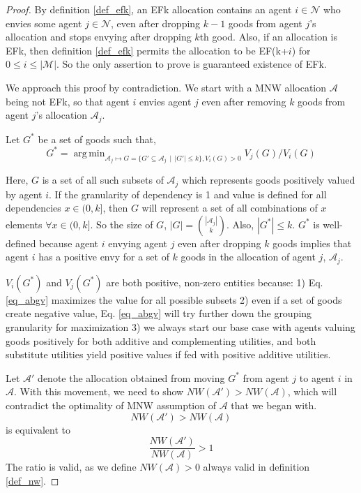 \begin{proof}
By definition \ref{def_efk}, an EFk allocation contains an agent $i \in \mathcal{N}$ who envies some agent $j \in \mathcal{N}$, even after dropping $k-1$ goods from agent $j$'s allocation and stops envying after dropping $k$th good. Also, if an allocation is EFk, then definition \ref{def_efk} permits the allocation to be EF(k+$i$) for $0 \leq i \leq |\mathcal{M}|$. So the only assertion to prove is guaranteed existence of EFk.

We approach this proof by contradiction. We start with a MNW allocation $\mathcal{A}$ being not EFk, so that agent $i$ envies agent $j$ even after removing $k$ goods from agent $j$'s allocation $\mathcal{A}_j$.



Let $G^*$  be a set of goods such that,
\[
    G^* = \operatorname{arg\,min}_{\mathcal{A}_j \mapsto G = \{G' \subseteq \mathcal{A}_j \, \mid \, \lvert G'\rvert \leq k\}, V_i(G)>0} V_j(G)/V_i(G)
\]

Here, $G$ is a set of all such subsets of $\mathcal{A}_j$ which represents goods positively valued by agent $i$. If the granularity of dependency is 1 and value is defined for all dependencies $x \in (0, k]$, then $G$ will represent a set of all combinations of $x$ elements $\forall x \in (0, k]$. So the size of $G$, $|G| = {{|\mathcal{A}_j|}\choose k}$. Also, $|G^*| \leq k$. $G^*$ is well-defined because agent $i$ envying agent $j$ even after dropping $k$ goods implies that agent $i$ has a positive envy for a set of $k$ goods in the allocation of agent $j$, $\mathcal{A}_j$.

$V_i(G^*)$ and $V_j(G^*)$ are both positive, non-zero entities because: 1) Eq. \ref{eq_abgv} maximizes the value for all possible subsets 2) even if a set of goods create negative value, Eq. \ref{eq_abgv} will try further down the grouping granularity for maximization 3) we always start our base case with agents valuing goods positively for both additive and complementing utilities, and both substitute utilities yield positive values if fed with positive additive utilities. 

Let $\mathcal{A}'$ denote the allocation obtained from moving $G^*$ from agent $j$ to agent $i$ in $\mathcal{A}$. With this movement, we need to show $NW(\mathcal{A}') > NW(\mathcal{A})$, which will contradict the optimality of MNW assumption of $\mathcal{A}$ that we began with.
$$
    NW(\mathcal{A}') > NW(\mathcal{A})
$$
is equivalent to
$$
    \frac{NW(\mathcal{A}')}{NW(\mathcal{A})} > 1
$$
The ratio is valid, as we define $NW(\mathcal{A}) > 0$ always valid in definition \ref{def_nw}.


\end{proof}
